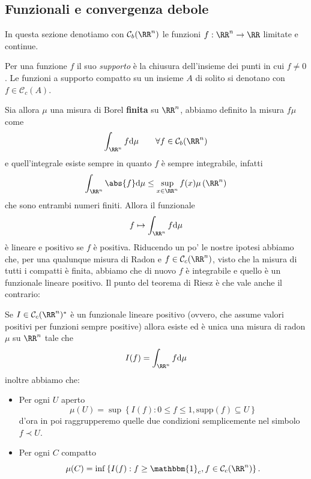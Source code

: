 \documentclass[11pt]{scrartcl}
\newcommand{\dif}{\text{d}}
\begin{document}
	\subsection{Funzionali e convergenza debole}
	
	In questa sezione denotiamo con $\mathcal{C}_b(\RR^n)$ le funzioni $f:\RR^n\to\RR$ limitate e continue. 
	\begin{definition}
		Per una funzione $f$ il suo \textit{supporto} è la chiusura dell'insieme dei punti in cui $f\ne 0$. Le funzioni a supporto compatto su un insieme $A$ di solito si denotano con $f\in \mathcal{C}_c(A)$.
	\end{definition}
	Sia allora $\mu$ una misura di Borel \textbf{finita} su $\RR^n$, abbiamo definito la misura $f\mu$ come
	$$\int_{\RR^n}f\dif \mu \qquad \forall f \in \mathcal{C}_b(\RR^n)$$
	e quell'integrale esiste sempre in quanto $f$ è sempre integrabile, infatti
	$$\int_{\RR^n}\abs{f}\dif \mu \le \sup_{x\in\RR^n}f(x)\mu\left(\RR^n\right)$$
	che sono entrambi numeri finiti. Allora il funzionale
	$$f\mapsto \int_{\RR^n}f\dif \mu$$
	è lineare e positivo se $f$ è positiva. Riducendo un po' le nostre ipotesi abbiamo che, per una qualunque misura di Radon e $f\in \mathcal{C}_c(\RR^n)$, visto che la misura di tutti i compatti è finita, abbiamo che di nuovo $f$ è integrabile e quello è un funzionale lineare positivo. Il punto del teorema di Riesz è che vale anche il contrario:
	\begin{theorem}[Riesz]
		Se $I\in \mathcal{C}_c(\RR^n)^*$ è un funzionale lineare positivo (ovvero, che assume valori positivi per funzioni sempre positive) allora esiste ed è unica una misura di radon $\mu$ su $\RR^n$ tale che
		$$I(f)=\int_{\RR^n}f\dif \mu$$
		inoltre abbiamo che:
		\begin{itemize}
			\item Per ogni $U$ aperto
			$$\mu(U)=\sup\left\{I(f):0\le f \le 1,\text{supp}(f)\subseteq U\right\}$$
			d'ora in poi raggrupperemo quelle due condizioni semplicemente nel simbolo $f\prec U$.
			\item Per ogni $C$ compatto
			$$\mu(C)=\inf\left\{I(f):f\ge \mathbbm{1}_c,f\in \mathcal{C}_c(\RR^n)\right\}.$$
		\end{itemize}
	\end{theorem}
\end{document}
